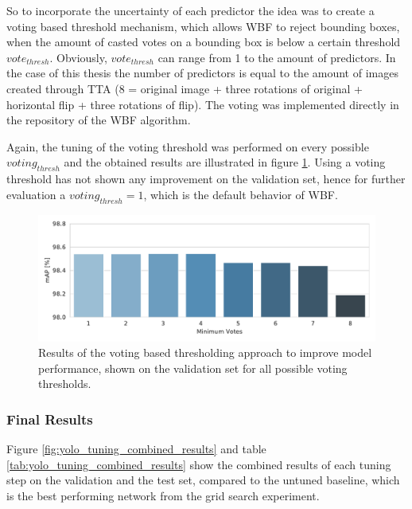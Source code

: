 So to incorporate the uncertainty of each predictor the idea was to create a voting based threshold mechanism, which allows \ac{WBF} to reject bounding boxes, when the amount of casted votes on a bounding box is below a certain threshold $vote_{thresh}$.
Obviously, $vote_{thresh}$ can range from 1 to the amount of predictors.
In the case of this thesis the number of predictors is equal to the amount of images created through \ac{TTA} (8 = original image + three rotations of original + horizontal flip + three rotations of flip).
The voting was implemented directly in the repository of the \ac{WBF} algorithm.

Again, the tuning of the voting threshold was performed on every possible $voting_{thresh}$ and the obtained results are illustrated in figure \ref{fig:wbf_tta_nms_votes}.
Using a voting threshold has not shown any improvement on the validation set, hence for further evaluation a $voting_{thresh} = 1$, which is the default behavior of \ac{WBF}.

\begin{figure}[H]
\begin{center}
    \includegraphics[width=15cm]{imgs/yolo_wbf_tta_votes.pdf}
    \caption{Results of the voting based thresholding approach to improve model performance, shown on the validation set for all possible voting thresholds.}
    \label{fig:wbf_tta_nms_votes}
\end{center}
\end{figure}

\subsubsection{Final Results}

Figure \ref{fig:yolo_tuning_combined_results} and table \ref{tab:yolo_tuning_combined_results} show the combined results of each tuning step on the validation and the test set, compared to the untuned baseline, which is the best performing network from the grid search experiment.

